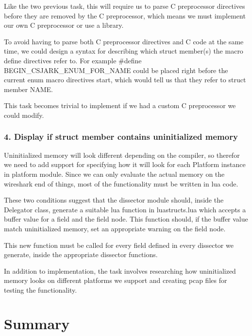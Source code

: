 Like the two previous task, this will require us to parse C preprocessor directives before they are removed by the C preprocessor, which means we must implement our own C preprocessor or use a library.

To avoid having to parse both C preprocessor directives and C code at the same time, we could design a syntax for describing which struct member(s) the macro define directives refer to. For example \#define BEGIN\_CSJARK\_ENUM\_FOR\_NAME could be placed right before the current enum macro directives start, which would tell us that they refer to struct member NAME.

This task becomes trivial to implement if we had a custom C preprocessor we could modify.

\subsubsection{4. Display if struct member contains uninitialized memory}
Uninitialized memory will look different depending on the compiler, so therefor we need to add support for specifying how it will look for each Platform instance in platform module. Since we can only evaluate the actual memory on the wireshark end of things, most of the functionality must be written in lua code.

These two conditions suggest that the dissector module should, inside the Delegator class, generate a suitable lua function in luastructs.lua which accepts a buffer value for a field and the field node. This function should, if the buffer value match uninitialized memory,  set an appropriate warning on the field node.

This new function must be called for every field defined in every dissector we generate, inside the appropriate dissector functions.

In addition to implementation, the task involves researching how uninitialized memory looks on different platforms we support and creating pcap files for testing the functionality.

\section{Summary}

